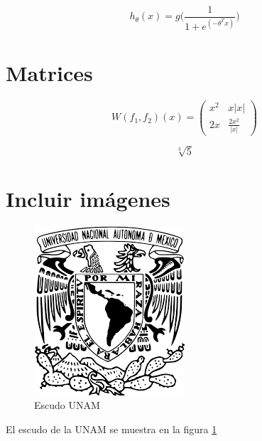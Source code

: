 \documentclass{article}
\begin{document}
\[
	h_\theta(x)=g\Bigg(\frac{1}{1+e^{(-\theta^Tx)}}\Bigg)
\]

\section{Matrices}

\[
	W(f_1, f_2)(x)=
	\begin{pmatrix}
	x^2 & x|x|\\
	2x & \frac{2x^2}{|x|}
	\end{pmatrix}
\]

\[
	\sqrt[3]{5}
\]

\section{Incluir imágenes}

\begin{figure}[h!]
	\centering
	\includegraphics[scale=0.5, angle=0]{img/unam}
	\caption{Escudo UNAM}
	\label{fig:UNAM}
\end{figure}

El escudo de la UNAM se muestra en la figura \ref{fig:UNAM}
\end{document}
